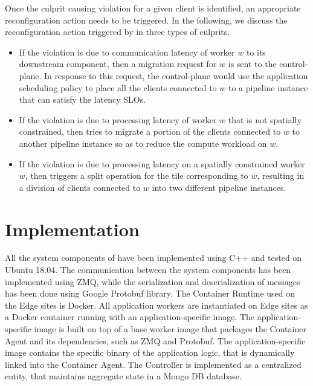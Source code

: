 \par Once the culprit causing violation for a given client is identified, an appropriate reconfiguration action needs to be triggered. In the following, we discuss the reconfiguration action triggered by \oneedge{} in three types of culprits.
\begin{itemize}
\item If the violation is due to communication latency of worker $w$ to its downstream component, then a migration request for $w$ is sent to the control-plane. In response to this request, the control-plane would use the application scheduling policy to place all the clients connected to $w$ to a pipeline instance that can satisfy the latency SLOs.
\item If the violation is due to processing latency of worker $w$ that is not spatially constrained, then \oneedge{} tries to migrate a portion of the clients connected to $w$ to another pipeline instance so as to reduce the compute workload on $w$.
\item If the violation is due to processing latency on a spatially constrained worker $w$, then \oneedge{} triggers a split operation for the tile corresponding to $w$, resulting in a division of clients connected to $w$ into two different pipeline instances.
\end{itemize}

\section{Implementation}
\label{sec:oneedge_impl}
All the system components of \oneedge{} have been implemented using C++ and tested on Ubuntu 18.04. The communication between the system components has been implemented using ZMQ, while the serialization and deserialization of messages has been done using Google Protobuf library. The Container Runtime used on the Edge sites is Docker. All application workers are instantiated on Edge sites as a Docker container running with an application-specific image. The application-specific image is built on top of a base worker image that packages the Container Agent and its dependencies, such as ZMQ and Protobuf. The application-specific image contains the specific binary of the application logic, that is dynamically linked into the Container Agent. The Controller is implemented as a centralized entity, that maintains aggregate state in a Mongo DB database. 

